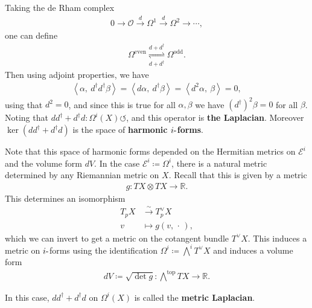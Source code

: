 \begin{example}[?]

Taking the de Rham complex
\begin{align*}
0 \to {\mathcal{O}}\xrightarrow{d} \Omega^1 \xrightarrow{d} \Omega^2 \to \cdots
,\end{align*}
one can define
\begin{align*}
\Omega^{\text{even}} \mathrel{\operatorname*{\rightleftharpoons}_{ d + d^{\dagger}}^{d + d^\dagger}} \Omega^{\text{odd}}
.\end{align*}
Then using adjoint properties, we have
\begin{align*}
{\left\langle {\alpha},~{ d^\dagger d^\dagger \beta} \right\rangle} = 
{\left\langle { d \alpha},~{ d^\dagger \beta} \right\rangle} =
{\left\langle { d^2 \alpha},~{ \beta } \right\rangle} = 
0
,\end{align*}
using that \(d^2 = 0\), and since this is true for all \(\alpha, \beta\)
we have \((d^\dagger)^2 \beta = 0\) for all \(\beta\). Noting that
\(d d^\dagger + d^\dagger d: \Omega^i(X) {\circlearrowleft}\), and this
operator is \textbf{the Laplacian}. Moreover
\(\ker (d d^\dagger + d^\dagger d )\) is the space of \textbf{harmonic
\(i{\hbox{-}}\)forms}.

\end{example}

\begin{remark}

Note that this space of harmonic forms depended on the Hermitian metrics
on \(\mathcal{E}^i\) and the volume form \(dV\). In the case
\(\mathcal{E}^i \coloneqq\Omega^i\), there is a natural metric
determined by any Riemannian metric on \(X\). Recall that this is given
by a metric
\begin{align*}
g: TX \otimes TX \to {\mathbb{R}}
.\end{align*}
This determines an isomorphism
\begin{align*}
T_p X &\xrightarrow{\sim} T_p^\vee X\\
v &\mapsto g(v, {\,\cdot\,})
,\end{align*}
which we can invert to get a metric on the cotangent bundle
\(T^\vee X\). This induces a metric on \(i{\hbox{-}}\)forms using the
identification \(\Omega^i \coloneqq\bigwedge^i T^\vee X\) and induces a
volume form
\begin{align*}
dV \coloneqq\sqrt{ \det g}: \bigwedge^{\text{top}} TX \to {\mathbb{R}}
.\end{align*}

In this case, \(d d^\dagger + d^\dagger d\) on \(\Omega^i(X)\) is called
the \textbf{metric Laplacian}.

\end{remark}

